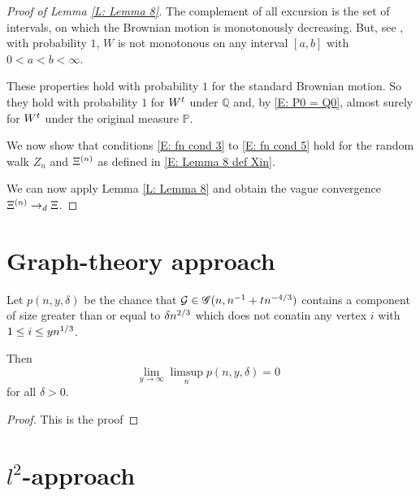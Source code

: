 \begin{proof}[Proof of Lemma \ref{L: Lemma 8}]
	The complement of all excursion is the set of intervals,
	on which the Brownian motion is monotonously decreasing.
	But, see \cite[Theorem 1.22]{Peres2008}, with probability $1$,
	$W$ is not monotonous on any interval $[a,b]$ with $0 < a < b < \infty$.
	
	These properties hold with probability $1$ for the standard Brownian motion.
	So they hold with probability $1$ for $W^t$ under $\mathbb{Q}$
	and, by \eqref{E: P0 = Q0}, 
	almost surely for $W^t$ under the original measure $\mathbb{P}$.
	
	
	We now show that conditions 
	\eqref{E: fn cond 3} to \eqref{E: fn cond 5}
	hold for the random walk $Z_n$ and $\Xi^{(n)}$
	as defined in \eqref{E: Lemma 8 def Xin}.
	


	We can now apply Lemma \ref{L: Lemma 8} and obtain the vague convergence
	$ \Xi^{(n)} \rightarrow_d \Xi $.
\end{proof}






\section{Graph-theory approach}



\begin{lemma} \label{L: Lemma 9}
	Let $p(n, y, \delta)$ be the chance that $\mathcal{G} \in \mathscr{G}(n, n^{-1} + tn^{-4/3})$
	contains a component of size greater than or equal to $\delta n^{2 / 3}$
	which does not conatin any vertex $i$ with $1 \leq i \leq yn^{1 / 3}$.
	
	Then
	\begin{equation}
	\lim_{y \rightarrow \infty} \limsup_n p(n, y, \delta) = 0 \enspace
	\end{equation}
	for all $\delta > 0$.
\end{lemma}
\begin{proof}
	This is the proof
\end{proof}








\section{$l^2$-approach}